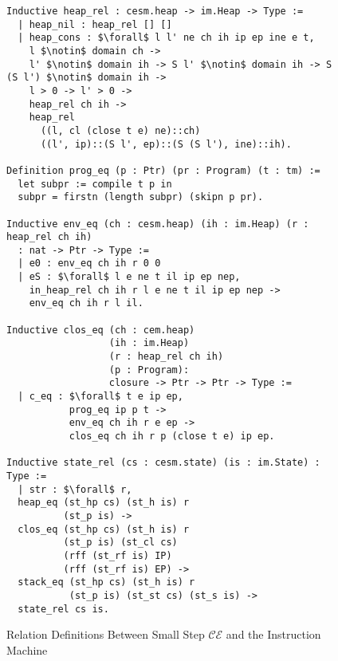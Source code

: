 \begin{figure}
\begin{lstlisting}
Inductive heap_rel : cesm.heap -> im.Heap -> Type := 
  | heap_nil : heap_rel [] [] 
  | heap_cons : $\forall$ l l' ne ch ih ip ep ine e t, 
    l $\notin$ domain ch -> 
    l' $\notin$ domain ih -> S l' $\notin$ domain ih -> S (S l') $\notin$ domain ih ->
    l > 0 -> l' > 0 -> 
    heap_rel ch ih -> 
    heap_rel 
      ((l, cl (close t e) ne)::ch) 
      ((l', ip)::(S l', ep)::(S (S l'), ine)::ih).

Definition prog_eq (p : Ptr) (pr : Program) (t : tm) := 
  let subpr := compile t p in 
  subpr = firstn (length subpr) (skipn p pr).

Inductive env_eq (ch : cesm.heap) (ih : im.Heap) (r : heap_rel ch ih)
  : nat -> Ptr -> Type :=
  | e0 : env_eq ch ih r 0 0 
  | eS : $\forall$ l e ne t il ip ep nep, 
    in_heap_rel ch ih r l e ne t il ip ep nep ->
    env_eq ch ih r l il.

Inductive clos_eq (ch : cem.heap) 
                  (ih : im.Heap) 
                  (r : heap_rel ch ih) 
                  (p : Program):
                  closure -> Ptr -> Ptr -> Type :=
  | c_eq : $\forall$ t e ip ep, 
           prog_eq ip p t -> 
           env_eq ch ih r e ep ->
           clos_eq ch ih r p (close t e) ip ep. 

Inductive state_rel (cs : cesm.state) (is : im.State) : Type := 
  | str : $\forall$ r, 
  heap_eq (st_hp cs) (st_h is) r 
          (st_p is) ->
  clos_eq (st_hp cs) (st_h is) r 
          (st_p is) (st_cl cs) 
          (rff (st_rf is) IP) 
          (rff (st_rf is) EP) ->
  stack_eq (st_hp cs) (st_h is) r 
           (st_p is) (st_st cs) (st_s is) ->
  state_rel cs is.
\end{lstlisting}
\caption{Relation Definitions Between Small Step $\mathcal{CE}$ and the
Instruction Machine}
\label{fig:state_rel}
\end{figure}

